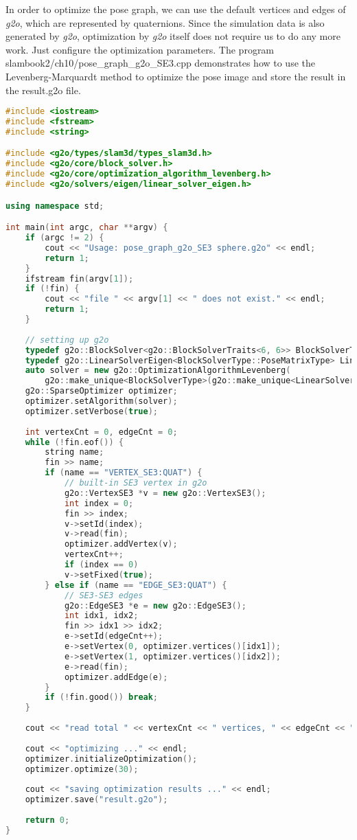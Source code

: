 In order to optimize the pose graph, we can use the default vertices and edges of \textit{g2o}, which are represented by quaternions. Since the simulation data is also generated by \textit{g2o}, optimization by \textit{g2o} itself does not require us to do any more work. Just configure the optimization parameters. The program slambook2/ch10/pose\_graph\_g2o\_SE3.cpp demonstrates how to use the Levenberg-Marquardt method to optimize the pose image and store the result in the result.g2o file.

\begin{lstlisting}[language=c++,caption=slambook2/ch10/pose\_graph\_g2o\_SE3.cpp]
#include <iostream>
#include <fstream>
#include <string>

#include <g2o/types/slam3d/types_slam3d.h>
#include <g2o/core/block_solver.h>
#include <g2o/core/optimization_algorithm_levenberg.h>
#include <g2o/solvers/eigen/linear_solver_eigen.h>

using namespace std;

int main(int argc, char **argv) {
	if (argc != 2) {
		cout << "Usage: pose_graph_g2o_SE3 sphere.g2o" << endl;
		return 1;
	}
	ifstream fin(argv[1]);
	if (!fin) {
		cout << "file " << argv[1] << " does not exist." << endl;
		return 1;
	}
	
	// setting up g2o
	typedef g2o::BlockSolver<g2o::BlockSolverTraits<6, 6>> BlockSolverType;
	typedef g2o::LinearSolverEigen<BlockSolverType::PoseMatrixType> LinearSolverType;
	auto solver = new g2o::OptimizationAlgorithmLevenberg(
		g2o::make_unique<BlockSolverType>(g2o::make_unique<LinearSolverType>()));
	g2o::SparseOptimizer optimizer;     
	optimizer.setAlgorithm(solver);   
	optimizer.setVerbose(true);       
	
	int vertexCnt = 0, edgeCnt = 0;
	while (!fin.eof()) {
		string name;
		fin >> name;
		if (name == "VERTEX_SE3:QUAT") {
			// built-in SE3 vertex in g2o
			g2o::VertexSE3 *v = new g2o::VertexSE3();
			int index = 0;
			fin >> index;
			v->setId(index);
			v->read(fin);
			optimizer.addVertex(v);
			vertexCnt++;
			if (index == 0)
			v->setFixed(true);
		} else if (name == "EDGE_SE3:QUAT") {
			// SE3-SE3 edges
			g2o::EdgeSE3 *e = new g2o::EdgeSE3();
			int idx1, idx2;    
			fin >> idx1 >> idx2;
			e->setId(edgeCnt++);
			e->setVertex(0, optimizer.vertices()[idx1]);
			e->setVertex(1, optimizer.vertices()[idx2]);
			e->read(fin);
			optimizer.addEdge(e);
		}
		if (!fin.good()) break;
	}
	
	cout << "read total " << vertexCnt << " vertices, " << edgeCnt << " edges." << endl;
	
	cout << "optimizing ..." << endl;
	optimizer.initializeOptimization();
	optimizer.optimize(30);
	
	cout << "saving optimization results ..." << endl;
	optimizer.save("result.g2o");
	
	return 0;
}
\end{lstlisting}

